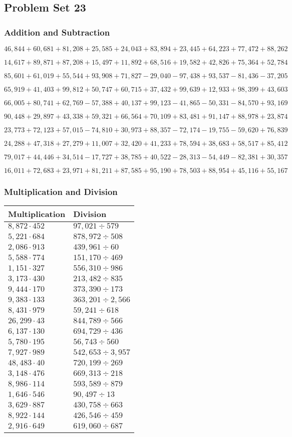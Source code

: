 \hypertarget{problem-set-23-4}{%
\subsection{Problem Set 23}\label{problem-set-23-4}}

\hypertarget{addition-and-subtraction-245}{%
\subsubsection{Addition and
Subtraction}\label{addition-and-subtraction-245}}

\(46,844+60,681+81,208+25,585+24,043+83,894+23,445+64,223+77,472+ 88,262\)

\(14,617+89,871+87,208+15,497+11,892+68,516+19,582+42,826+75,364+52,784\)

\(85,601+61,019+55,544+93,908+71,827-29,040-97,438+93,537-81,436-37,205\)

\(65,919+41,403+99,812+50,747+60,715+37,432+99,639+12,933+98,399+43,603\)

\(66,005+80,741+62,769-57,388+40,137+99,123-41,865-50,331-84,570+93,169\)

\(90,448+29,897+43,338+59,321+66,564+70,109+83,481+91,147+88,978+23,874\)

\(23,773+72,123+57,015-74,810+30,973+88,357-72,174-19,755-59,620+76,839\)

\(24,288+47,318+27,279+11,007+32,420+41,233+78,594+38,683+58,517+85,412\)

\(79,017+44,446+34,514-17,727+38,785+40,522-28,313-54,449-82,381+30,357\)

\(16,011+72,683+23,971+81,211+87,585+95,190+78,503+88,954+45,116+55,167\)

\hypertarget{multiplication-and-division-244}{%
\subsubsection{Multiplication and
Division}\label{multiplication-and-division-244}}

\begin{longtable}[]{@{}ll@{}}
\toprule
Multiplication & Division\tabularnewline
\midrule
\endhead
\(8,872\cdot452\) & \(97,021÷579\)\tabularnewline
\(5,221\cdot684\) & \(878,972÷508\)\tabularnewline
\(2,086\cdot913\) & \(439,961÷60\)\tabularnewline
\(5,588\cdot774\) & \(151,170 ÷469\)\tabularnewline
\(1,151\cdot327\) & \(556,310÷986\)\tabularnewline
\(3,173\cdot430\) & \(213,482÷835\)\tabularnewline
\(9,444\cdot170\) & \(373,390÷173\)\tabularnewline
\(9,383\cdot133\) & \(363,201÷2,566\)\tabularnewline
\(8,431\cdot979\) & \(59,241÷618\)\tabularnewline
\(26,299\cdot43\) & \(844,789÷566\)\tabularnewline
\(6,137\cdot130\) & \(694,729÷436\)\tabularnewline
\(5,780\cdot195\) & \(56,743÷560\)\tabularnewline
\(7,927\cdot989\) & \(542,653÷3,957\)\tabularnewline
\(48,483\cdot40\) & \(720,199÷269\)\tabularnewline
\(3,148\cdot476\) & \(669,313÷218\)\tabularnewline
\(8,986\cdot114\) & \(593,589÷879\)\tabularnewline
\(1,646\cdot546\) & \(90,497÷13\)\tabularnewline
\(3,629\cdot887\) & \(430,758÷663\)\tabularnewline
\(8,922\cdot144\) & \(426,546÷459\)\tabularnewline
\(2,916\cdot649\) & \(619,060÷687\)\tabularnewline
\bottomrule
\end{longtable}

